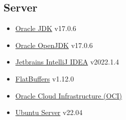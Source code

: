 \documentclass[12pt,a4paper]{article}
\begin{document}
  \subsection{Server}
  \begin{itemize}
      \item \href{https://www.oracle.com/java}{Oracle JDK} v17.0.6
      \item \href{https://jdk.java.net/17}{Oracle OpenJDK} v17.0.6
      \item \href{https://www.jetbrains.com/idea}{Jetbrains IntelliJ IDEA} v2022.1.4
      \item \href{https://google.github.io/flatbuffers}{FlatBuffers} v1.12.0
      \item \href{https://www.oracle.com/cloud}{Oracle Cloud Infrastructure (OCI)}
      \item \href{https://ubuntu.com}{Ubuntu Server} v22.04
  \end{itemize}
  
  \newpage
  
\end{document}
